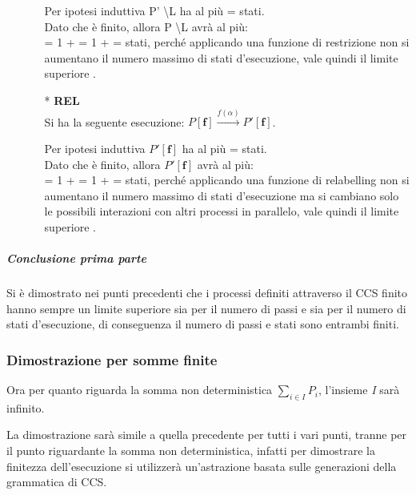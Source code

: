 \begin{itemize}
\begin{itemize}
		Per ipotesi induttiva  P' \textbackslash L ha al più  =  stati. \\
		Dato che  è finito, allora P \textbackslash L avrà al più: \\
		 = 1 +  = 1 +  =  stati, perché applicando una funzione di restrizione non si aumentano il numero massimo di stati d'esecuzione, vale quindi il limite superiore .
			\\
		\item[*] \textbf{REL}
		\\
		Si ha la seguente esecuzione: $P \mathbf{[f]} \overset{f(\alpha)}\rightarrow P'\mathbf{[f]}$. 
		
		Per ipotesi induttiva  $P'\mathbf{[f]}$ ha al più  =  stati. \\
		Dato che  è finito, allora $P'\mathbf{[f]}$ avrà al più: \\
		 = 1 +  = 1 +  =  stati, perché applicando una funzione di relabelling non si aumentano il numero massimo di stati d'esecuzione ma si cambiano solo le possibili interazioni con altri processi in parallelo, vale quindi il limite superiore .
		
	\end{itemize}
\end{itemize}

\subparagraph{Conclusione prima parte} \mbox{}

Si è dimostrato nei punti precedenti che i processi definiti attraverso il CCS finito hanno sempre un limite superiore sia per il numero di passi e sia per il numero di stati d'esecuzione, di conseguenza il numero di passi e stati sono entrambi finiti.

\subsubsection{Dimostrazione per somme finite}
Ora per quanto riguarda la somma non deterministica $\displaystyle\sum_{i\in I}^{}P_{i}$, l'insieme \textit{I} sarà infinito.

La dimostrazione sarà simile a quella precedente per tutti i vari punti, tranne per il punto riguardante la somma non deterministica, infatti per dimostrare la finitezza dell'esecuzione si utilizzerà un'astrazione basata sulle generazioni della grammatica di CCS.

